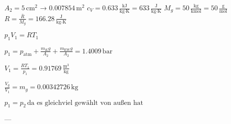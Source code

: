 \( A_2 = 5 \, \text{cm}^2 \) → \( 0.007854 \, \text{m}^2 \)  
\( c_V = 0.633 \, \frac{\text{kJ}}{\text{kg·K}} = 633 \, \frac{\text{J}}{\text{kg·K}} \)  
\( M_g = 50 \, \frac{\text{kg}}{\text{kmol}} = 50 \, \frac{\text{g}}{\text{mol}} \)  
\( R = \frac{\bar{R}}{M_g} = 166.28 \, \frac{\text{J}}{\text{kg·K}} \)  

\( p_1 V_1 = R T_1 \)  

\( p_1 = p_{\text{atm}} + \frac{m_K g}{A_2} + \frac{m_{\text{EW}} g}{A_2} = 1.4009 \, \text{bar} \)  

\( V_1 = \frac{R T_1}{p_1} = 0.91769 \, \frac{\text{m}^3}{\text{kg}} \)  

\( \frac{V_g}{V_1} = m_g = 0.00342726 \, \text{kg} \)  

\( p_1 = p_2 \, \text{da es gleichviel gewählt von außen hat} \)  

---